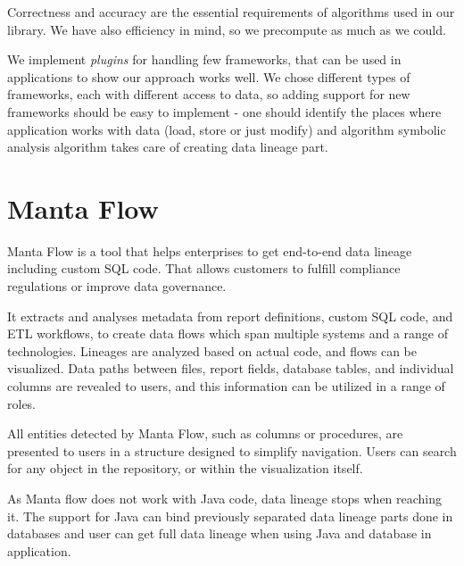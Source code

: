 Correctness and accuracy are the essential requirements of algorithms used
in our library. We have also efficiency in mind, so we precompute as much
as we could.

We implement \textit{plugins} for handling few frameworks, that can be used
in applications to show our approach works well. We chose different types
of frameworks, each with different access to data, so adding support
for new frameworks should be easy to implement - one should identify
the places where application works with data (load, store or just modify)
and algorithm symbolic analysis algorithm takes care of creating
data lineage part.





\section{Manta Flow}

Manta Flow is a tool that helps enterprises to get end-to-end
data lineage including custom SQL code. That allows customers to fulfill
compliance regulations or improve data governance.

It extracts and analyses metadata from report definitions,
custom SQL code, and ETL workflows, to create data flows
which span multiple systems and a range of technologies.
Lineages are analyzed based on actual code, and flows can be visualized.
Data paths between files, report fields, database tables,
and individual columns are revealed to users,
and this information can be utilized in a range of roles.

All entities detected by Manta Flow, such as columns or procedures,
are presented to users in a structure designed to simplify navigation.
Users can search for any object in the repository,
or within the visualization itself.

As Manta flow does not work with Java code, data lineage
stops when reaching it. The support for Java can bind
previously separated data lineage parts done in databases
and user can get full data lineage when using Java and database
in application.






